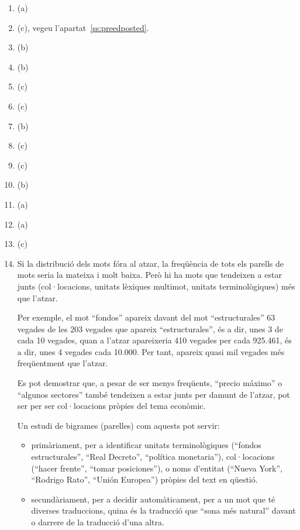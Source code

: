 \begin{enumerate}
\item (a)
\item (c), vegeu l'apartat~\ref{ss:preedposted}.
\item (b)
\item (b)
\item (c)
\item (c)
\item (b)
\item (c)
\item (c)
\item (b)
\item (a)
\item (a)
\item (c)
\item 
   Si la distribució dels mots fóra al atzar, la freqüència de tots
   els parells de mots seria la mateixa i molt baixa. Però hi ha mots
   que tendeixen a estar junts (col·locacions, unitats lèxiques
   multimot, unitats terminològiques) més que l'atzar. 

   Per exemple, el mot ``fondos'' apareix davant del mot ``estructurales''
   63 vegades de les 203 vegades que apareix ``estructurales'', és a
   dir, unes 3 de cada 10 vegades, quan a l'atzar apareixeria 410
   vegades per cada 925.461, és a dir, unes 4 vegades cada 10.000. Per
   tant, apareix quasi mil vegades més freqüentment que l'atzar.

   Es pot demostrar que, a pesar de ser menys freqüents, ``precio
   máximo'' o ``algunos sectores'' també tendeixen a estar junts per
   damunt de l'atzar, pot ser per ser col·locacions pròpies del tema
   econòmic.

   Un estudi de bigrames (parelles) com aquests pot servir:

   \begin{itemize}
   \item primàriament, per a identificar unitats terminològiques
     (``fondos estructurales'', ``Real Decreto'', ``política monetaria''),
     col·locacions (``hacer frente'', ``tomar posiciones''), o noms
     d'entitat (``Nueva York'', ``Rodrigo Rato'', ``Unión Europea'') pròpies
     del text en qüestió.
   
     \item secundàriament, per a decidir automàticament, per a un mot que
     té diverses traduccions, quina és la traducció que ``sona més
     natural'' davant o darrere de la traducció d'una altra.
   \end{itemize}


\end{enumerate}
